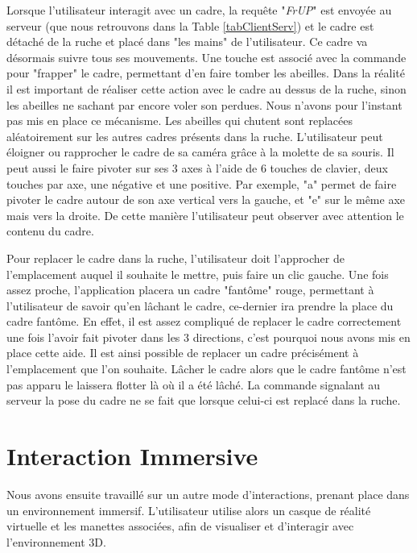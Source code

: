 		Lorsque l'utilisateur interagit avec un cadre, la requête "\textit{FrUP}" est envoyée au serveur (que nous retrouvons dans la Table \ref{tabClientServ}) et le cadre est détaché de la ruche et placé dans "les mains" de l'utilisateur. Ce cadre va désormais suivre tous ses mouvements. Une touche est associé avec la commande pour "frapper" le cadre, permettant d'en faire tomber les abeilles. Dans la réalité il est important de réaliser cette action avec le cadre au dessus de la ruche, sinon les abeilles ne sachant par encore voler son perdues. Nous n'avons pour l'instant pas mis en place ce mécanisme. Les abeilles qui chutent sont replacées aléatoirement sur les autres cadres présents dans la ruche.
		L'utilisateur peut éloigner ou rapprocher le cadre de sa caméra grâce à la molette de sa souris. Il peut aussi le faire pivoter sur ses 3 axes à l'aide de 6 touches de clavier, deux touches par axe, une négative et une positive. Par exemple, "a" permet de faire pivoter le cadre autour de son axe vertical vers la gauche, et "e" sur le même axe mais vers la droite. De cette manière l'utilisateur peut observer avec attention le contenu du cadre.
		
		Pour replacer le cadre dans la ruche, l'utilisateur doit l'approcher de l'emplacement auquel il souhaite le mettre, puis faire un clic gauche. Une fois assez proche, l'application placera un cadre "fantôme" rouge, permettant à l'utilisateur de savoir qu'en lâchant le cadre, ce-dernier ira prendre la place du cadre fantôme. En effet, il est assez compliqué de replacer le cadre correctement une fois l'avoir fait pivoter dans les 3 directions, c'est pourquoi nous avons mis en place cette aide. Il est ainsi possible de replacer un cadre précisément à l'emplacement que l'on souhaite. Lâcher le cadre alors que le cadre fantôme n'est pas apparu le laissera flotter là où il a été lâché. La commande signalant au serveur la pose du cadre ne se fait que lorsque celui-ci est replacé dans la ruche.
		
		
		
	\section{Interaction Immersive}
	\label{immersionSansTangibles}
		Nous avons ensuite travaillé sur un autre mode d'interactions, prenant place dans un environnement immersif. L'utilisateur utilise alors un casque de réalité virtuelle et les manettes associées, afin de visualiser et d'interagir avec l'environnement 3D.
		
